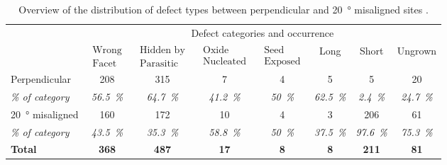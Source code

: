 \begin{table}
    \centering
    \caption[Overview of the distribution of defect types between perpendicular and \qty{20}{\degree} misaligned sites.]{Overview of the distribution of defect types between perpendicular and \qty{20}{\degree} misaligned sites \cite{Brugnolotto2023_2}.}
    \begin{tabular}{l|ccccccc}
        \hline
         & \multicolumn{7}{c}{Defect categories and occurrence} \\ 
         & $\begin{matrix} \text{Wrong} \\ \text{Facet} \end{matrix}$ & $\begin{matrix} \text{Hidden by} \\ \text{Parasitic} \end{matrix}$ & $\begin{matrix} \text{Oxide} \\ \text{Nucleated} \end{matrix}$ & $\begin{matrix} \text{Seed} \\ \text{Exposed} \end{matrix}$ & Long & Short & Ungrown \\ 
        \hline \hline
        Perpendicular & \num{208} & \num{315} & \num{7} & \num{4} & \num{5} & \num{5} & \num{20} \\ 
        \textit{\% of category} & \textit{\qty{56.5}{\%}} & \textit{\qty{64.7}{\%}} & \textit{\qty{41.2}{\%}} & \textit{\qty{50}{\percent}} & \textit{\qty{62.5}{\%}} & \textit{\qty{2.4}{\%}} & \textit{\qty{24.7}{\%}} \\ 
        \hline
        \qty{20}{\degree} misaligned & \num{160} & \num{172} & \num{10} & \num{4} & \num{3} & \num{206} & \num{61} \\ 
        \textit{\% of category} & \textit{\qty{43.5}{\%}} & \textit{\qty{35.3}{\%}} & \textit{\qty{58.8}{\%}} & \textit{\qty{50}{\%}} & \textit{\qty{37.5}{\%}} & \textit{\qty{97.6}{\%}} & \textit{\qty{75.3}{\%}} \\ 
        \hline
        \textbf{Total} & \textbf{\num{368}} & \textbf{\num{487}} & \textbf{\num{17}} & \textbf{\num{8}} & \textbf{\num{8}} & \textbf{\num{211}} & \textbf{\num{81}} \\
        \hline
    \end{tabular}
    \label{tab:defects_overview_sites}
\end{table}

